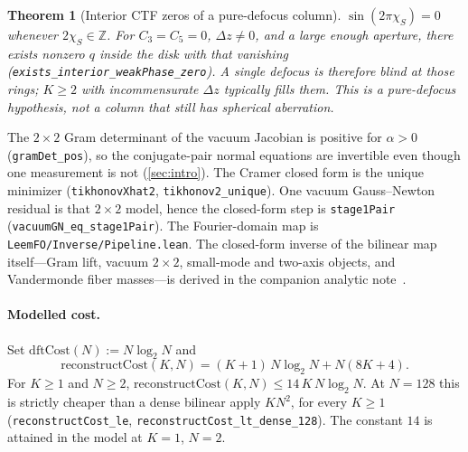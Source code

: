 \documentclass[11pt,a4paper]{article}
\newtheorem{theorem}{Theorem}[section]
\theoremstyle{definition}
\theoremstyle{remark}
\newcommand{\Z}{\mathbb{Z}}
\newcommand{\Dz}{\Delta z}
\begin{document}
\begin{theorem}[Interior CTF zeros of a pure-defocus column]
\label{thm:ctfzero}
$\sin(2\pi\chi_S)=0$ whenever $2\chi_S\in\Z$.
For $C_3=C_5=0$, $\Dz\neq 0$, and a large enough aperture, there exists
nonzero $q$ inside the disk with that vanishing
(\texttt{exists\_interior\_weakPhase\_zero}).
A single defocus is therefore blind at those rings; $K\ge 2$ with
incommensurate $\Dz$ typically fills them.
This is a pure-defocus hypothesis, not a column that still has
spherical aberration.
\end{theorem}

The $2\times 2$ Gram determinant of the vacuum Jacobian is positive for
$\alpha>0$ (\texttt{gramDet\_pos}), so the conjugate-pair normal
equations are invertible even though one measurement is not
(\cref{sec:intro}).
The Cramer closed form is the unique minimizer
(\texttt{tikhonovXhat2}, \texttt{tikhonov2\_unique}).
One vacuum Gauss--Newton residual is that $2\times 2$ model, hence the
closed-form step is \texttt{stage1Pair}
(\texttt{vacuumGN\_eq\_stage1Pair}).
The Fourier-domain map is \texttt{LeemFO/Inverse/Pipeline.lean}.
The closed-form inverse of the bilinear map itself---Gram lift,
vacuum $2\times 2$, small-mode and two-axis objects, and Vandermonde
fiber masses---is derived in the companion analytic
note~\cite{Lau2026analytic}.

\paragraph{Modelled cost.}
Set $\mathrm{dftCost}(N):=N\log_2 N$ and
\begin{equation}
\mathrm{reconstructCost}(K,N)
=(K+1)\,N\log_2 N+N(8K+4).
\end{equation}
For $K\ge 1$ and $N\ge 2$,
$\mathrm{reconstructCost}(K,N)\le 14\,K\,N\log_2 N$.
At $N=128$ this is strictly cheaper than a dense bilinear apply
$KN^2$, for every $K\ge 1$
(\texttt{reconstructCost\_le},
\texttt{reconstructCost\_lt\_dense\_128}).
The constant $14$ is attained in the model at $K=1$, $N=2$.
\end{document}
